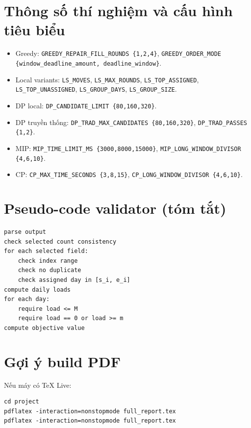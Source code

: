 \documentclass[12pt,a4paper]{article}
\begin{document}
\section{Thông số thí nghiệm và cấu hình tiêu biểu}
\begin{itemize}
  \item Greedy: \texttt{GREEDY\_REPAIR\_FILL\_ROUNDS \{1,2,4\}}, \texttt{GREEDY\_ORDER\_MODE \{window\_deadline\_amount, deadline\_window\}}.
  \item Local variants: \texttt{LS\_MOVES}, \texttt{LS\_MAX\_ROUNDS}, \texttt{LS\_TOP\_ASSIGNED}, \texttt{LS\_TOP\_UNASSIGNED}, \texttt{LS\_GROUP\_DAYS}, \texttt{LS\_GROUP\_SIZE}.
  \item DP local: \texttt{DP\_CANDIDATE\_LIMIT \{80,160,320\}}.
  \item DP truyền thống: \texttt{DP\_TRAD\_MAX\_CANDIDATES \{80,160,320\}}, \texttt{DP\_TRAD\_PASSES \{1,2\}}.
  \item MIP: \texttt{MIP\_TIME\_LIMIT\_MS \{3000,8000,15000\}}, \texttt{MIP\_LONG\_WINDOW\_DIVISOR \{4,6,10\}}.
  \item CP: \texttt{CP\_MAX\_TIME\_SECONDS \{3,8,15\}}, \texttt{CP\_LONG\_WINDOW\_DIVISOR \{4,6,10\}}.
\end{itemize}

\section{Pseudo-code validator (tóm tắt)}
\begin{lstlisting}
parse output
check selected count consistency
for each selected field:
    check index range
    check no duplicate
    check assigned day in [s_i, e_i]
compute daily loads
for each day:
    require load <= M
    require load == 0 or load >= m
compute objective value
\end{lstlisting}

\section{Gợi ý build PDF}
Nếu máy có TeX Live:
\begin{lstlisting}
cd project
pdflatex -interaction=nonstopmode full_report.tex
pdflatex -interaction=nonstopmode full_report.tex
\end{lstlisting}
\end{document}
